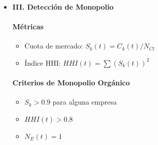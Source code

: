 \documentclass[a4paper,12pt]{article}
\begin{document}
\begin{itemize}
    \paragraph{Fase de Decisión del Cliente}
    Cada cliente $Cl_j$ evalúa todas las empresas $E_k$ calculando su utilidad percibida:

    \[
    U_{j,k} = w_{\text{dist}} \cdot \text{DistNorm}(j,k) + w_Q \cdot Q_k - w_P \cdot P_k + w_{\text{red}} \cdot \frac{C_k}{N_{Cl}}
    \]

    Si $U_{j,E_{\text{mejor}}} > U_{j,E_{\text{aff},j}} \cdot (1 + \text{Inercia}_j)$, el cliente cambia de empresa.

    \paragraph{Fase de Evolución de la Empresa}
    \begin{itemize}
        \item Actualización de $C_k$ (base de clientes)
        \item Cálculo de ganancias: $(P_k - \text{Costo Unitario}) \cdot C_k - F_k$
        \item Actualización de $K_k$
        \item Innovación: con probabilidad $\propto K_k$, mejora en $Q_k$
        \item Ajuste de precios según la dinámica de clientes
        \item Muerte si $K_k$ cae por debajo de $\theta_K$
        \item Posible surgimiento de nueva empresa con baja probabilidad
    \end{itemize}

    \item \textbf{III. Detección de Monopolio}

    \paragraph{Métricas}
    \begin{itemize}
        \item Cuota de mercado: $S_k(t) = C_k(t)/N_{Cl}$
        \item Índice HHI: $HHI(t) = \sum (S_k(t))^2$
    \end{itemize}

    \paragraph{Criterios de Monopolio Orgánico}
    \begin{itemize}
        \item $S_k > 0.9$ para alguna empresa
        \item $HHI(t) > 0.8$
        \item $N_E(t) = 1$
    \end{itemize}


\end{itemize}
\end{document}
